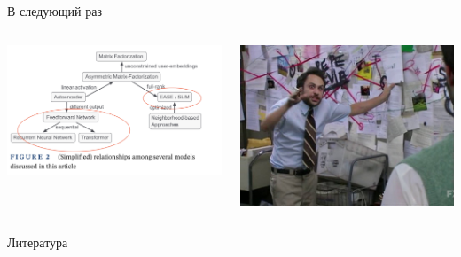 \documentclass[11pt,aspectratio=169]{beamer}
\begin{document}
\begin{frame}{В следующий раз}

\begin{columns}

\begin{column}{0.47\textwidth} 
\begin{center}
\includegraphics[scale=0.3]{images/relationships.png}
\end{center}
\end{column}

\begin{column}{0.47\textwidth}
\begin{center}
\includegraphics[scale=0.15]{images/conspiracy.jpeg}
\end{center}
\end{column}

\end{columns}

\end{frame}

\begin{frame}[allowframebreaks]{Литература}




\end{frame}
\end{document}
